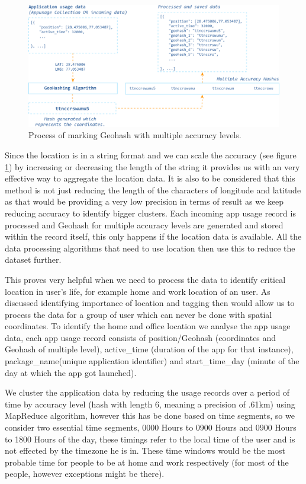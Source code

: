 \documentclass[prodmode,acmtecs]{acmsmall}
\begin{document}
\begin{figure}[hbtp]
 \centering
 \includegraphics[width=120mm]{geohash.png}
  \caption {Process of marking Geohash with multiple accuracy levels.}
 \label{fig:geohashtablemap}
\end{figure}

Since the location is in a string format and we can scale the accuracy (see figure  \ref{fig:geohashtablemap}) by increasing or decreasing the length of the string it provides us with an very effective way to aggregate the location data. It is also to be considered that this method is not just reducing the length of the characters of longitude and latitude as that would be providing a very low precision in terms of result as we keep reducing accuracy to identify bigger clusters. Each incoming app usage record is processed and Geohash for multiple accuracy levels are generated and stored within the record itself, this only happens if the location data is available. All the data processing algorithms that need to use location then use this to reduce the dataset further. 

This proves very helpful when we need to process the data to identify critical location in user's life, for example home and work location of an user. As discussed identifying importance of location and tagging then would allow us to process the data for a group of user which can never be done with spatial coordinates. To identify the home and office location we analyse the app usage data, each app usage record consists of position/Geohash (coordinates and Geohash of multiple level), active\_time (duration of the app for that instance), package\_name(unique application identifier) and start\_time\_day (minute of the day at which the app got launched).

We cluster the application data by reducing the usage records over a period of time by accuracy level (hash with length 6, meaning a precision of .61km) using MapReduce algorithm, however this has be done based on time segments, so we consider two essential time segments, 0000 Hours to 0900 Hours and 0900 Hours to 1800 Hours of the day, these timings refer to the local time of the user and is not effected by the timezone he is in. These time windows would be the most probable time for people to be at home and work respectively (for most of the people, however exceptions might be there). 
\end{document}
